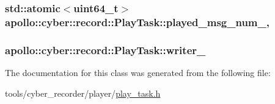 \hypertarget{classapollo_1_1cyber_1_1record_1_1PlayTask_a5dd34256985b04cbd9e22e57cd5d5f61}{
\subsubsection[{played\-\_\-msg\-\_\-num\-\_\-}]{\setlength{\rightskip}{0pt plus 5cm}std\-::atomic$<$uint64\-\_\-t$>$ apollo\-::cyber\-::record\-::\-Play\-Task\-::played\-\_\-msg\-\_\-num\-\_\-\hspace{0.3cm}{\ttfamily [static]}, {\ttfamily [private]}}}\label{classapollo_1_1cyber_1_1record_1_1PlayTask_a5dd34256985b04cbd9e22e57cd5d5f61}
\hypertarget{classapollo_1_1cyber_1_1record_1_1PlayTask_ae2caf470e78e9d706b321d9891d9f44b}{
\subsubsection[{writer\-\_\-}]{ apollo\-::cyber\-::record\-::\-Play\-Task\-::writer\-\_\-\hspace{0.3cm}{\ttfamily [private]}}}\label{classapollo_1_1cyber_1_1record_1_1PlayTask_ae2caf470e78e9d706b321d9891d9f44b}


The documentation for this class was generated from the following file\-:\begin{DoxyCompactItemize}
\item 
tools/cyber\-\_\-recorder/player/\hyperlink{play__task_8h}{play\-\_\-task.\-h}\end{DoxyCompactItemize}
